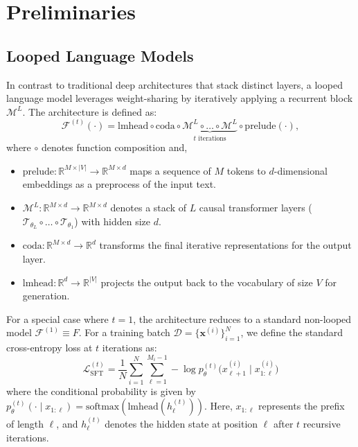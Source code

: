 

\section{Preliminaries}

\subsection{Looped Language Models}

In contrast to traditional deep architectures that stack distinct layers, a looped language model leverages weight-sharing by iteratively applying a recurrent block $\mathcal{M}^L$. The architecture is defined as:
$$\mathcal{F}^{(t)}(\cdot) = \text{lmhead} \circ \text{coda} \circ \underbrace{\mathcal{M}^L \circ \dots \circ \mathcal{M}^L}_{t \text{ iterations}} \circ \text{prelude}(\cdot),$$
 where $\circ$  denotes function composition and,
\begin{itemize}[leftmargin=1em,nosep]
    \item  $\text{prelude}: \mathbb{R}^{M\times|V|} \to \mathbb{R}^{M \times d}$ maps a sequence of $M$ tokens to $d$-dimensional embeddings as a preprocess of the input text.
    \item  $\mathcal{M}^L: \mathbb{R}^{M \times d} \to \mathbb{R}^{M \times d}$ denotes a stack of $L$ causal transformer layers ($\mathcal{T}_{\theta_L} \circ \dots \circ \mathcal{T}_{\theta_1}$) with hidden size $d$.
    \item   $\text{coda}: \mathbb{R}^{M \times d} \to \mathbb{R}^d$ transforms the final iterative representations for the output layer.
    \item  $\text{lmhead}: \mathbb{R}^d \to \mathbb{R}^{|V|}$ projects the output back to the vocabulary of size $V$ for generation.
\end{itemize}
For a special case where $t = 1$, the architecture reduces to a standard non-looped model $\mathcal{F}^{(1)} \equiv F$. For a training batch $\mathcal{D} = \{ \mathbf{x}^{(i)} \}_{i=1}^N$, we define the standard cross-entropy loss at $t$ iterations as:
\begin{equation}
\mathcal{L}_{\text{SFT}}^{(t)} = \frac{1}{N} \sum_{i=1}^N \sum_{\ell=1}^{M_i - 1} -\log p_{\theta}^{(t)}\big( x_{\ell+1}^{(i)} \mid x_{1:\ell}^{(i)} \big)
\label{e1}
\end{equation}
where the conditional probability is given by $p_{\theta}^{(t)}(\cdot \mid x_{1:\ell}) = \text{softmax}(\text{lmhead}(h_{\ell}^{(t)}))$. Here, $x_{1:\ell}$ represents the prefix of length $\ell$, and $h_{\ell}^{(t)}$ denotes the hidden state at position $\ell$ after $t$ recursive iterations.

